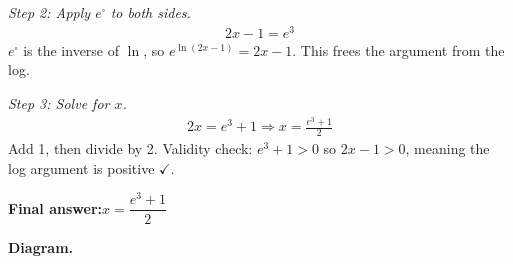 \documentclass[11pt]{article}
\begin{document}
\textit{Step 2: Apply \( e^{\square} \) to both sides.}
\[\begin{gathered}
2x - 1 = e^3
\end{gathered}\]
\( e^{\square} \) is the inverse of \( \ln \), so \( e^{\ln(2x-1)} = 2x-1 \). This frees the argument from the log.

\textit{Step 3: Solve for \( x \).}
\[\begin{gathered}
2x = e^3 + 1 \Rightarrow x = \frac{e^3 + 1}{2}
\end{gathered}\]
Add 1, then divide by 2. Validity check: \( e^3 + 1 > 0 \) so \( 2x - 1 > 0 \), meaning the log argument is positive $\checkmark$.

\begin{answerbox}
\textbf{Final answer:}\quad \(\displaystyle  x = \dfrac{e^3 + 1}{2} \)
\end{answerbox}
\textbf{Diagram.}
\end{document}

